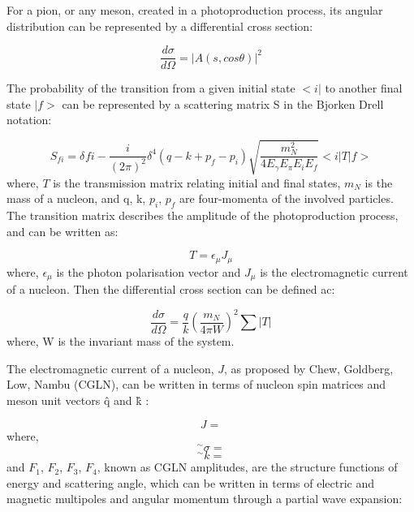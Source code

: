 \indent For a pion, or any meson, created in a photoproduction process, its angular distribution can be represented by a differential cross section:

\begin{equation}
\frac{d\sigma}{d\Omega}=|A(s,cos\theta)|^{2}
\end{equation}

\indent The probability of the transition from a given initial state $<i|$ to another final state $|f>$ can be represented by a scattering matrix S in the Bjorken Drell notation\cite{bjorken}:

\begin{equation}
S_{fi}=\delta_{}fi-\frac{i}{(2\pi)^{2}}\delta^{4}(q-k+p_{f}-p_{i})\sqrt{\frac{m_{N}^{2}}{4E_{\gamma}E_{\pi}E_{i}E_{f}}}<i|T|f>
\end{equation}
where, $T$ is the transmission matrix relating initial and final states, $m_{N}$ is the mass of a nucleon, and q, k, $p_{i}$, $p_{f}$ are four-momenta of the involved particles. The transition matrix describes the amplitude of the photoproduction process, and can be written as:

\begin{equation}
T=\epsilon_{\mu}J_{\mu}
\end{equation}
where, $\epsilon_{\mu}$ is the photon polarisation vector and $J_{\mu}$ is the electromagnetic current of a nucleon. Then the differential cross section can be defined ac:

\begin{equation}
\frac{d\sigma}{d\Omega}=\frac{q}{k}(\frac{m_{N}}{4\pi W})^{2}\sum |T|
\end{equation}
where, W is the invariant mass of the system.

\indent The electromagnetic current of a nucleon, $J$, as proposed by Chew, Goldberg, Low, Nambu (CGLN), can be written in terms of nucleon spin matrices and meson unit vectors \^q and \^k \cite{chew}:

\begin{equation}
J=%
\end{equation}
where,
\begin{equation}
^{\sim}\sigma=%
\end{equation}
\begin{equation}
^{\sim} k=%
\end{equation}
and $F_{1}$, $F_{2}$, $F_{3}$, $F_{4}$, known as CGLN amplitudes, are the structure functions of energy and scattering angle, which can be written in terms of electric and magnetic multipoles and angular momentum through a partial wave expansion:

